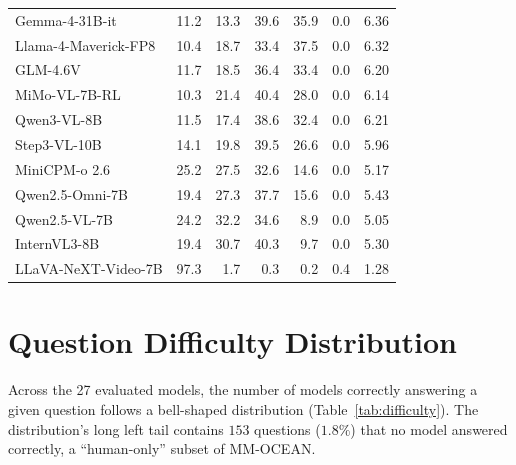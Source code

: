 \documentclass{article}
\newcommand{\benchname}{MM-OCEAN}
\begin{document}
\begin{table}[t]
{\begin{tabular}{lrrrrrr}
Gemma-4-31B-it       & 11.2 & 13.3 & 39.6 & 35.9 & 0.0 & 6.36 \\
Llama-4-Maverick-FP8 & 10.4 & 18.7 & 33.4 & 37.5 & 0.0 & 6.32 \\
GLM-4.6V             & 11.7 & 18.5 & 36.4 & 33.4 & 0.0 & 6.20 \\
MiMo-VL-7B-RL        & 10.3 & 21.4 & 40.4 & 28.0 & 0.0 & 6.14 \\
Qwen3-VL-8B          & 11.5 & 17.4 & 38.6 & 32.4 & 0.0 & 6.21 \\
Step3-VL-10B         & 14.1 & 19.8 & 39.5 & 26.6 & 0.0 & 5.96 \\
MiniCPM-o 2.6        & 25.2 & 27.5 & 32.6 & 14.6 & 0.0 & 5.17 \\
Qwen2.5-Omni-7B      & 19.4 & 27.3 & 37.7 & 15.6 & 0.0 & 5.43 \\
Qwen2.5-VL-7B        & 24.2 & 32.2 & 34.6 &  8.9 & 0.0 & 5.05 \\
InternVL3-8B         & 19.4 & 30.7 & 40.3 &  9.7 & 0.0 & 5.30 \\
LLaVA-NeXT-Video-7B  & 97.3 &  1.7 &  0.3 &  0.2 & 0.4 & 1.28 \\
\bottomrule
\end{tabular}%
}
\end{table}

\section{Question Difficulty Distribution}
\label{app:difficulty}
Across the 27 evaluated models, the number of models correctly answering a given question follows a bell-shaped distribution (Table~\ref{tab:difficulty}). The distribution's long left tail contains $153$ questions ($1.8\%$) that no model answered correctly, a ``human-only'' subset of \benchname{}.
\end{document}
